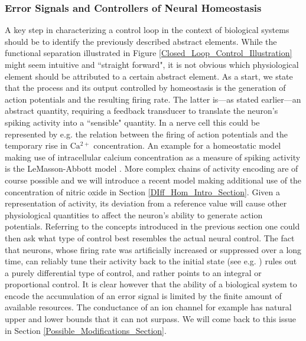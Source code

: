 \documentclass[10pt,a4paper]{article}
\begin{document}
\subsubsection{Error Signals and Controllers of Neural Homeostasis}
A key step in characterizing a control loop in the context of biological systems should be to identify the previously described abstract elements. While the functional separation illustrated in Figure \ref{Closed_Loop_Control_Illustration} might seem intuitive and ``straight forward", it is not obvious which physiological element should be attributed to a certain abstract element.
As a start, we state that the process and its output controlled by homeostasis is the generation of action potentials and the resulting firing rate. The latter is---as stated earlier---an abstract quantity, requiring a feedback transducer to translate the neuron's spiking activity into a ``sensible" quantity. In a nerve cell this could be represented by e.g. the relation between the firing of action potentials and the temporary rise in $\mathrm{Ca^{2+}}$ concentration. An example for a homeostatic model making use of intracellular calcium concentration as a measure of spiking activity is the LeMasson-Abbott model \cite{LeMasson_1993}. More complex chains of activity encoding are of course possible and we will introduce a recent model making additional use of the concentration of nitric oxide in Section \ref{DIff_Hom_Intro_Section}. Given a representation of activity, its deviation from a reference value will cause other physiological quantities to affect the neuron's ability to generate action potentials. Referring to the concepts introduced in the previous section one could then ask what type of control best resembles the actual neural control. The fact that neurons, whose firing rate was artificially increased or suppressed over a long time, can reliably tune their activity back to the initial state (see e.g. \cite{Burrone_2002}) rules out a purely differential type of control, and rather points to an integral or proportional control. It is clear however that the ability of a biological system to encode the accumulation of an error signal is limited by the finite amount of available resources. The conductance of an ion channel for example has natural upper and lower bounds that it can not surpass. We will come back to this issue in Section \ref{Possible_Modifications_Section}.
\end{document}
